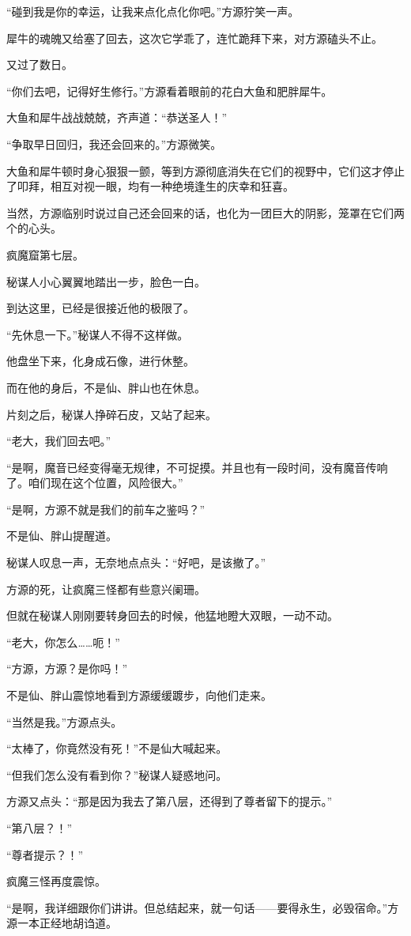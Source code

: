 \begin{this_body}
“碰到我是你的幸运，让我来点化点化你吧。”方源狞笑一声。

犀牛的魂魄又给塞了回去，这次它学乖了，连忙跪拜下来，对方源磕头不止。

又过了数日。

“你们去吧，记得好生修行。”方源看着眼前的花白大鱼和肥胖犀牛。

大鱼和犀牛战战兢兢，齐声道：“恭送圣人！”

“争取早日回归，我还会回来的。”方源微笑。

大鱼和犀牛顿时身心狠狠一颤，等到方源彻底消失在它们的视野中，它们这才停止了叩拜，相互对视一眼，均有一种绝境逢生的庆幸和狂喜。

当然，方源临别时说过自己还会回来的话，也化为一团巨大的阴影，笼罩在它们两个的心头。

疯魔窟第七层。

秘谋人小心翼翼地踏出一步，脸色一白。

到达这里，已经是很接近他的极限了。

“先休息一下。”秘谋人不得不这样做。

他盘坐下来，化身成石像，进行休整。

而在他的身后，不是仙、胖山也在休息。

片刻之后，秘谋人挣碎石皮，又站了起来。

“老大，我们回去吧。”

“是啊，魔音已经变得毫无规律，不可捉摸。并且也有一段时间，没有魔音传响了。咱们现在这个位置，风险很大。”

“是啊，方源不就是我们的前车之鉴吗？”

不是仙、胖山提醒道。

秘谋人叹息一声，无奈地点点头：“好吧，是该撤了。”

方源的死，让疯魔三怪都有些意兴阑珊。

但就在秘谋人刚刚要转身回去的时候，他猛地瞪大双眼，一动不动。

“老大，你怎么……呃！”

“方源，方源？是你吗！”

不是仙、胖山震惊地看到方源缓缓踱步，向他们走来。

“当然是我。”方源点头。

“太棒了，你竟然没有死！”不是仙大喊起来。

“但我们怎么没有看到你？”秘谋人疑惑地问。

方源又点头：“那是因为我去了第八层，还得到了尊者留下的提示。”

“第八层？！”

“尊者提示？！”

疯魔三怪再度震惊。

“是啊，我详细跟你们讲讲。但总结起来，就一句话——要得永生，必毁宿命。”方源一本正经地胡诌道。

\end{this_body}

